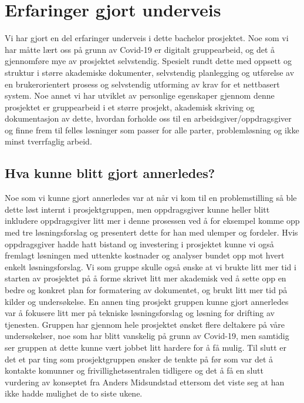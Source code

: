 \section{Erfaringer gjort underveis}


Vi har gjort en del erfaringer underveis i dette bachelor prosjektet. Noe som vi har måtte lært oss på grunn av Covid-19 er digitalt gruppearbeid, og det å gjennomføre mye av prosjektet selvstendig. Spesielt rundt dette med oppsett og struktur i større akademiske dokumenter, selvstendig planlegging og utførelse av en brukerorientert prosess og selvstendig utforming av krav for et nettbasert system. Noe annet vi har utviklet av personlige egenskaper gjennom denne prosjektet er gruppearbeid i et større prosjekt, akademisk skriving og dokumentasjon av dette, hvordan forholde oss til en arbeidsgiver/oppdragsgiver og finne frem til felles løsninger som passer for alle parter, problemløsning og ikke minst tverrfaglig arbeid.

\subsection{Hva kunne blitt gjort annerledes?}


Noe som vi kunne gjort annerledes var at når vi kom til en problemstilling så ble dette løst internt i prosjektgruppen, men oppdragsgiver kunne heller blitt inkludere oppdragsgiver litt mer i denne prosessen ved å for eksempel komme opp med tre løsningsforslag og presentert dette for han med ulemper og fordeler. Hvis oppdragsgiver hadde hatt bistand og investering i prosjektet kunne vi også fremlagt løsningen med uttenkte kostnader og analyser bundet opp mot hvert enkelt løsningsforslag. Vi som gruppe skulle også ønske at vi brukte litt mer tid i starten av prosjektet på å forme skrivet litt mer akademisk ved å sette opp en bedre og konkret plan for formatering av dokumentet, og brukt litt mer tid på kilder og undersøkelse. En annen ting prosjekt gruppen kunne gjort annerledes var å fokusere litt mer på tekniske løsningsforslag og løsning for drifting av tjenesten. Gruppen har gjennom hele prosjektet ønsket flere deltakere på våre undersøkelser, noe som har blitt vanskelig på grunn av Covid-19, men samtidig ser gruppen at dette kunne vært jobbet litt hardere for å få mulig. Til slutt er det et par ting som prosjektgruppen ønsker de tenkte på før som var det å kontakte komunner og frivillighetssentralen tidligere og det å få en slutt vurdering av konseptet fra Anders Midsundstad ettersom det viste seg at han ikke hadde mulighet de to siste ukene. 

